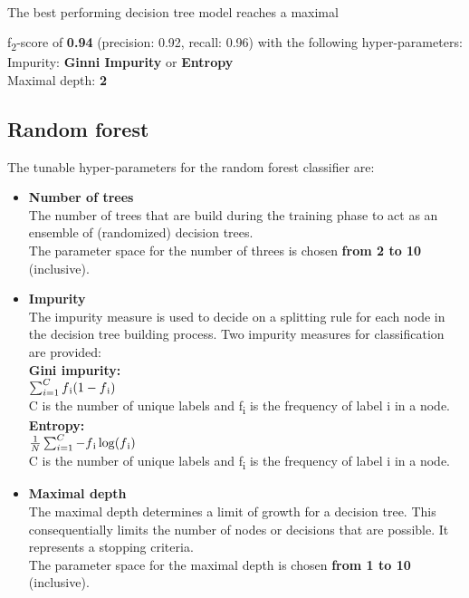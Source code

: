 {{
\\
The best performing decision tree model reaches a maximal {f\textsubscript{2}-score of \textbf{0.94} (precision:  0.92, recall: 0.96) with the following hyper-parameters:\\
Impurity: \qquad  \qquad \textbf{Ginni Impurity} or \textbf{Entropy} \\
Maximal depth: \qquad \textbf{2}




\subsection*{Random forest}

The tunable hyper-parameters for the random forest classifier are:
\begin{itemize}

\item{\textbf{Number of trees}}\\
The number of trees that are build during the training phase to act as an ensemble of (randomized) decision trees.\\
The parameter space for the number of threes is chosen \textbf{from 2 to 10} (inclusive). 

\item{\textbf{Impurity}}\\
The impurity measure is used to decide on a splitting rule for each node in the decision tree building process.
Two impurity measures for classification are provided:\\
\textbf{Gini impurity:}  \\
$\sum_{i=1}^{C} f\textsubscript{i}(1-f\textsubscript{i}) $ \\
C is the number of unique labels and f\textsubscript{i} is the frequency of label i in a node. \\
\textbf{Entropy:}\\
$\frac{1}{N}\sum_{i=1}^{C} -f\textsubscript{i}\log(f\textsubscript{i}) $ \\
C is the number of unique labels and f\textsubscript{i} is the frequency of label i in a node. \\
\item{\textbf{Maximal depth}}\\
The maximal depth determines a limit of growth for a decision tree. This consequentially limits the number of nodes or decisions that are possible. It represents a stopping criteria. \\
The parameter space for the maximal depth is chosen \textbf{from 1 to 10} (inclusive). 
\end{itemize}

}}}

